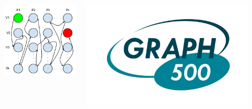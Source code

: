 \documentclass[final]{beamer} %
\begin{document}
\begin{frame}[t]
\begin{columns}[t]
\begin{column}{0.60\paperwidth}
\begin{columns}[t,totalwidth=0.60\paperwidth]
\begin{column}{0.28\paperwidth}
\begin{columns}[t,totalwidth=0.28\paperwidth]
\begin{column}{0.12\paperwidth}
								\begin{center} \includegraphics[width=0.12\paperwidth]{img/linked_list/rand_node_seq_proc} \end{center}
							\end{column}
							\begin{column}{0.12\paperwidth}
								\begin{center} \includegraphics[width=0.12\paperwidth]{img/logo_graph500} \end{center}
							\end{column}
						\end{columns}
					\end{column}
					\begin{column}{0.28\paperwidth}

\end{column}
\end{columns}
\end{column}
\end{columns}
\end{frame}
\end{document}
